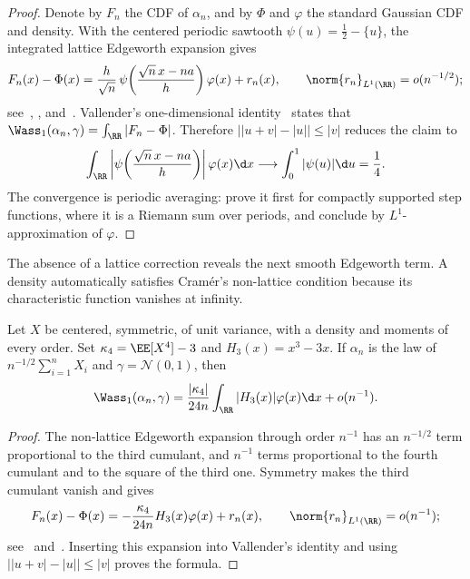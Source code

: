 \begin{proof}
	Denote by \(F_n\) the CDF of \(\alpha_n\), and by \(\Phi\) and \(\varphi\) the standard Gaussian CDF and density. With the centered periodic sawtooth \(\psi(u)=\frac12-\{u\}\), the integrated lattice Edgeworth expansion gives
	\[
		F_n(x)-\Phi(x)
		=
		\frac h{\sqrt n}\,
		\psi\!\left(\frac{\sqrt n\,x-na}{h}\right)\varphi(x)+r_n(x),
		\qquad
		\norm{r_n}_{L^1(\RR)}=o(n^{-1/2});
	\]
	see~\cite[Chapter~VII]{Petrov1975}, \cite[Chapter~5]{BhattacharyaRao2010}, and~\cite{KolassaMcCullagh1990}. Vallender's one-dimensional identity~\cite{Vallender1974} states that \(\Wass_1(\alpha_n,\gamma)=\int_\RR|F_n-\Phi|\). Therefore \(\big||u+v|-|u|\big|\leq|v|\) reduces the claim to
	\[
		\int_\RR
		\left|\psi\!\left(\frac{\sqrt n\,x-na}{h}\right)\right|
		\varphi(x)\d x
		\longrightarrow
		\int_0^1|\psi(u)|\d u
		=
		\frac14.
	\]
	The convergence is periodic averaging: prove it first for compactly supported step functions, where it is a Riemann sum over periods, and conclude by \(L^1\)-approximation of \(\varphi\).
\end{proof}

The absence of a lattice correction reveals the next smooth Edgeworth term. A density automatically satisfies Cram\'er's non-lattice condition because its characteristic function vanishes at infinity.

\begin{prop}\label{prop-sharp-density-w1-clt}
	Let \(X\) be centered, symmetric, of unit variance, with a density and moments of every order. Set \(\kappa_4=\EE[X^4]-3\) and \(H_3(x)=x^3-3x\). If \(\alpha_n\) is the law of \(n^{-1/2}\sum_{i=1}^nX_i\) and \(\gamma=\mathcal N(0,1)\), then
	\[
		\Wass_1(\alpha_n,\gamma)
		=
		\frac{|\kappa_4|}{24n}
		\int_\RR |H_3(x)|\varphi(x)\d x
		+o(n^{-1}).
	\]
\end{prop}

\begin{proof}
	The non-lattice Edgeworth expansion through order \(n^{-1}\) has an \(n^{-1/2}\) term proportional to the third cumulant, and \(n^{-1}\) terms proportional to the fourth cumulant and to the square of the third one. Symmetry makes the third cumulant vanish and gives
	\[
		F_n(x)-\Phi(x)
		=-\frac{\kappa_4}{24n}H_3(x)\varphi(x)+r_n(x),
		\qquad
		\norm{r_n}_{L^1(\RR)}=o(n^{-1});
	\]
	see~\cite[Chapter~VI]{Petrov1975} and~\cite[Chapter~4]{BhattacharyaRao2010}. Inserting this expansion into Vallender's identity and using \(\big||u+v|-|u|\big|\leq|v|\) proves the formula.
\end{proof}

